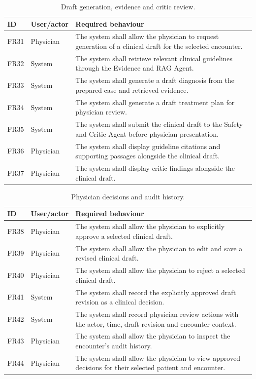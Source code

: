 \begin{table}[htbp]
\centering
\small
\caption{Draft generation, evidence and critic review.}
\label{tab:kashaf:fr-reasoning}
\begin{tabular}{|p{}|p{}|p{}|}
\hline
ID & User/actor & Required behaviour \\ \hline
FR31 & Physician & The system shall allow the physician to request generation of a clinical draft for the selected encounter. \\ \hline
FR32 & System & The system shall retrieve relevant clinical guidelines through the Evidence and RAG Agent. \\ \hline
FR33 & System & The system shall generate a draft diagnosis from the prepared case and retrieved evidence. \\ \hline
FR34 & System & The system shall generate a draft treatment plan for physician review. \\ \hline
FR35 & System & The system shall submit the clinical draft to the Safety and Critic Agent before physician presentation. \\ \hline
FR36 & Physician & The system shall display guideline citations and supporting passages alongside the clinical draft. \\ \hline
FR37 & Physician & The system shall display critic findings alongside the clinical draft. \\ \hline
\end{tabular}
\end{table}

\begin{table}[htbp]
\centering
\small
\caption{Physician decisions and audit history.}
\label{tab:kashaf:fr-review}
\begin{tabular}{|p{}|p{}|p{}|}
\hline
ID & User/actor & Required behaviour \\ \hline
FR38 & Physician & The system shall allow the physician to explicitly approve a selected clinical draft. \\ \hline
FR39 & Physician & The system shall allow the physician to edit and save a revised clinical draft. \\ \hline
FR40 & Physician & The system shall allow the physician to reject a selected clinical draft. \\ \hline
FR41 & System & The system shall record the explicitly approved draft revision as a clinical decision. \\ \hline
FR42 & System & The system shall record physician review actions with the actor, time, draft revision and encounter context. \\ \hline
FR43 & Physician & The system shall allow the physician to inspect the encounter's audit history. \\ \hline
FR44 & Physician & The system shall allow the physician to view approved decisions for their selected patient and encounter. \\ \hline
\end{tabular}
\end{table}

